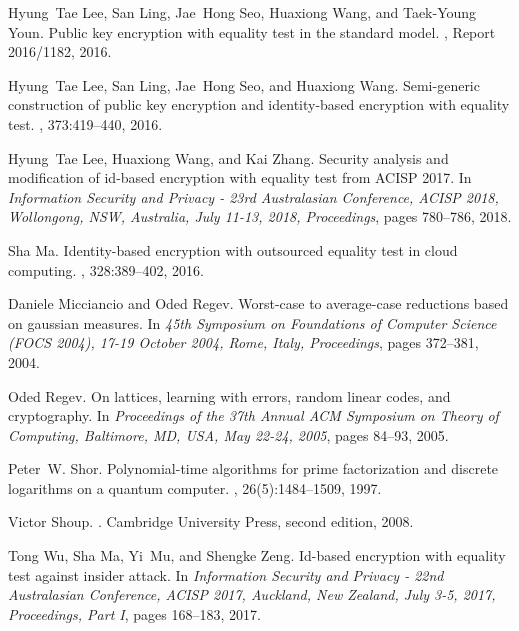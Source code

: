 \documentclass[runningheads]{llncs}
\begin{document}
\begin{thebibliography}{99}
Hyung~Tae Lee, San Ling, Jae~Hong Seo, Huaxiong Wang, and Taek-Young Youn.
\newblock Public key encryption with equality test in the standard model.
, Report 2016/1182, 2016.

Hyung~Tae Lee, San Ling, Jae~Hong Seo, and Huaxiong Wang.
\newblock Semi-generic construction of public key encryption and identity-based
  encryption with equality test.
, 373:419--440, 2016.

Hyung~Tae Lee, Huaxiong Wang, and Kai Zhang.
\newblock Security analysis and modification of id-based encryption with
  equality test from {ACISP} 2017.
\newblock In {\em Information Security and Privacy - 23rd Australasian
  Conference, {ACISP} 2018, Wollongong, NSW, Australia, July 11-13, 2018,
  Proceedings}, pages 780--786, 2018.

Sha Ma.
\newblock Identity-based encryption with outsourced equality test in cloud
  computing.
, 328:389--402, 2016.

Daniele Micciancio and Oded Regev.
\newblock Worst-case to average-case reductions based on gaussian measures.
\newblock In {\em 45th Symposium on Foundations of Computer Science {(FOCS}
  2004), 17-19 October 2004, Rome, Italy, Proceedings}, pages 372--381, 2004.

Oded Regev.
\newblock On lattices, learning with errors, random linear codes, and
  cryptography.
\newblock In {\em Proceedings of the 37th Annual {ACM} Symposium on Theory of
  Computing, Baltimore, MD, USA, May 22-24, 2005}, pages 84--93, 2005.

Peter~W. Shor.
\newblock Polynomial-time algorithms for prime factorization and discrete
  logarithms on a quantum computer.
, 26(5):1484--1509, 1997.

Victor Shoup.
.
\newblock Cambridge University Press, second edition, 2008.

Tong Wu, Sha Ma, Yi~Mu, and Shengke Zeng.
\newblock Id-based encryption with equality test against insider attack.
\newblock In {\em Information Security and Privacy - 22nd Australasian
  Conference, {ACISP} 2017, Auckland, New Zealand, July 3-5, 2017, Proceedings,
  Part {I}}, pages 168--183, 2017.

\end{thebibliography}
\end{document}
